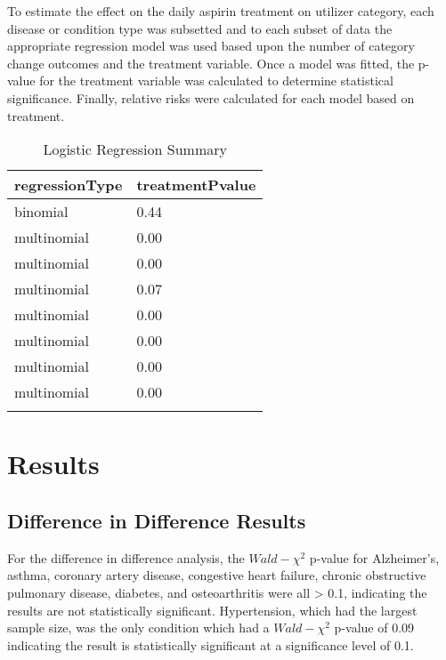 \documentclass[
  english,
  man]{apa6}
\begin{document}
To estimate the effect on the daily aspirin treatment on utilizer category, each disease or condition type was subsetted and to each subset of data the appropriate regression model was used based upon the number of category change outcomes and the treatment variable. Once a model was fitted, the p-value for the treatment variable was calculated to determine statistical significance. Finally, relative risks were calculated for each model based on treatment.

\begin{table}[tbp]

\begin{center}
\begin{threeparttable}

\caption{\label{tab:logTable}Logistic Regression Summary}

\begin{tabular}{ll}
\toprule{}
regressionType & \multicolumn{1}{c}{treatmentPvalue}\\
\midrule{}
binomial & 0.44\\
multinomial & 0.00\\
multinomial & 0.00\\
multinomial & 0.07\\
multinomial & 0.00\\
multinomial & 0.00\\
multinomial & 0.00\\
multinomial & 0.00\\
\bottomrule{}
\end{tabular}

\end{threeparttable}
\end{center}

\end{table}

\hypertarget{results}{%
\section{Results}\label{results}}

\hypertarget{difference-in-difference-results}{%
\subsection{Difference in Difference Results}\label{difference-in-difference-results}}

For the difference in difference analysis, the \(Wald-\chi^2\) p-value for Alzheimer's, asthma, coronary artery disease, congestive heart failure, chronic obstructive pulmonary disease, diabetes, and osteoarthritis were all \textgreater{} 0.1, indicating the results are not statistically significant. Hypertension, which had the largest sample size, was the only condition which had a \(Wald-\chi^2\) p-value of 0.09 indicating the result is statistically significant at a significance level of 0.1.
\end{document}
